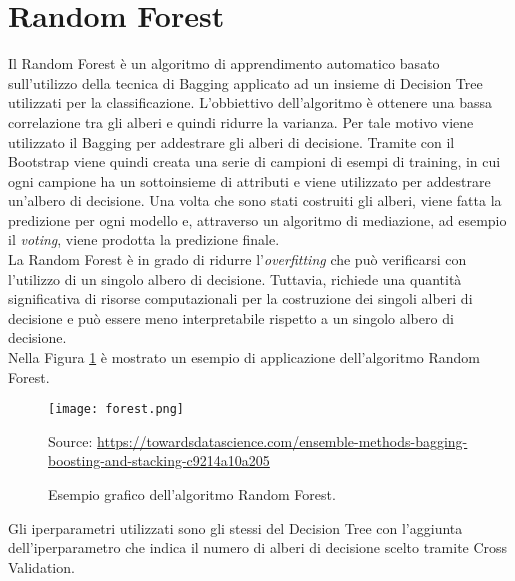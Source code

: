 \section{Random Forest}
Il Random Forest \autocite{ho1995random} è un algoritmo di apprendimento automatico basato sull'utilizzo della tecnica di Bagging applicato ad un insieme di Decision Tree utilizzati per la classificazione. L'obbiettivo dell'algoritmo è ottenere una bassa correlazione tra gli alberi e quindi ridurre la varianza. Per tale motivo viene utilizzato il Bagging per addestrare gli alberi di decisione. Tramite con il Bootstrap viene quindi creata una serie di campioni di esempi di training, in cui ogni campione ha un sottoinsieme di attributi e viene utilizzato per addestrare un'albero di decisione. Una volta che sono stati costruiti gli alberi, viene fatta la predizione per ogni modello e, attraverso un algoritmo di mediazione, ad esempio il \emph{voting}, viene prodotta la predizione finale.\\
La Random Forest è in grado di ridurre l'\emph{overfitting} che può verificarsi con l'utilizzo di un singolo albero di decisione. Tuttavia, richiede una quantità significativa di risorse computazionali per la costruzione dei singoli alberi di decisione e può essere meno interpretabile rispetto a un singolo albero di decisione.\\
Nella Figura \ref{fig:forest} è mostrato un esempio di applicazione dell'algoritmo Random Forest.
\begin{figure}[h]
	\begin{center}
		\texttt{[image: forest.png]}
		\caption{Esempio grafico dell'algoritmo Random Forest.
		} 
		Source: \url{https://towardsdatascience.com/ensemble-methods-bagging-boosting-and-stacking-c9214a10a205}\label{fig:forest}
	\end{center}
\end{figure}
Gli iperparametri utilizzati sono gli stessi del Decision Tree con l'aggiunta dell'iperparametro che indica il numero di alberi di decisione scelto tramite Cross Validation.
